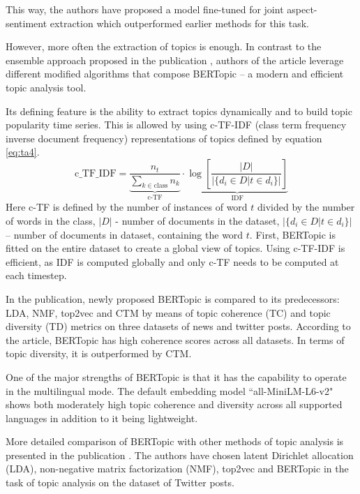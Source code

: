\documentclass[13pt, a4paper]{article}
\begin{document}
This way, the authors have proposed a model fine-tuned for joint aspect-sentiment extraction which outperformed earlier methods for this task.

However, more often the extraction of topics is enough. In contrast to the ensemble approach proposed in the publication \cite{onan2019two}, authors of the article \cite{grootendorst2022bertopic} leverage different modified algorithms that compose BERTopic -- a modern and efficient topic analysis tool.

Its defining feature is the ability to extract topics dynamically and to build topic popularity time series. This is allowed by using c-TF-IDF (class term frequency inverse document frequency) representations of topics defined by equation \ref{eq:ta4}.
\begin{equation} \label{eq:ta4}
\mathrm{c\_TF\_IDF} = \underbrace{\frac{n_t}{\sum\limits_{k \in \mathrm{class}} n_k}}_{\textrm{c-TF}} \cdot \underbrace{\log \left[ \frac{|D|}{|\{ d_i \in D | t \in d_i \}|} \right]}_{\mathrm{IDF}}
\end{equation}
Here c-TF is defined by the number of instances of word $t$ divided by the number of words in the class, $|D|$ - number of documents in the dataset, $|\{ d_i \in D | t \in d_i \}|$ -- number of documents in dataset, containing the word $t$. First, BERTopic is fitted on the entire dataset to create a global view of topics. Using c-TF-IDF is efficient, as IDF is computed globally and only c-TF needs to be computed at each timestep.

In the publication, newly proposed BERTopic is compared to its predecessors: LDA, NMF, top2vec and CTM by means of topic coherence (TC) and topic diversity (TD) metrics on three datasets of news and twitter posts. According to the article, BERTopic has high coherence scores across all datasets. In terms of topic diversity, it is outperformed by CTM.

One of the major strengths of BERTopic is that it has the capability to operate in the multilingual mode. The default embedding model ``all-MiniLM-L6-v2" shows both moderately high topic coherence and diversity across all supported languages in addition to it being lightweight.

More detailed comparison of BERTopic with other methods of topic analysis is presented in the publication \cite{egger2022topic}. The authors have chosen latent Dirichlet allocation (LDA), non-negative matrix factorization (NMF), top2vec and BERTopic in the task of topic analysis on the dataset of Twitter posts.
\end{document}
